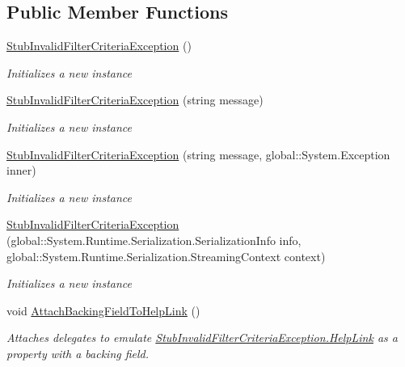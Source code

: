\subsection*{Public Member Functions}
\begin{DoxyCompactItemize}
\item 
\hyperlink{class_system_1_1_reflection_1_1_fakes_1_1_stub_invalid_filter_criteria_exception_a94c607f09115d5aca1cbf268df9ce8cd}{Stub\-Invalid\-Filter\-Criteria\-Exception} ()
\begin{DoxyCompactList}\small\item\em Initializes a new instance\end{DoxyCompactList}\item 
\hyperlink{class_system_1_1_reflection_1_1_fakes_1_1_stub_invalid_filter_criteria_exception_a2b8cabb8680c45a8c38f32785372a9f3}{Stub\-Invalid\-Filter\-Criteria\-Exception} (string message)
\begin{DoxyCompactList}\small\item\em Initializes a new instance\end{DoxyCompactList}\item 
\hyperlink{class_system_1_1_reflection_1_1_fakes_1_1_stub_invalid_filter_criteria_exception_a39cfb89bb28a959b677b9f0725e942c9}{Stub\-Invalid\-Filter\-Criteria\-Exception} (string message, global\-::\-System.\-Exception inner)
\begin{DoxyCompactList}\small\item\em Initializes a new instance\end{DoxyCompactList}\item 
\hyperlink{class_system_1_1_reflection_1_1_fakes_1_1_stub_invalid_filter_criteria_exception_a5c851e0a9ceae44b518983029727af3e}{Stub\-Invalid\-Filter\-Criteria\-Exception} (global\-::\-System.\-Runtime.\-Serialization.\-Serialization\-Info info, global\-::\-System.\-Runtime.\-Serialization.\-Streaming\-Context context)
\begin{DoxyCompactList}\small\item\em Initializes a new instance\end{DoxyCompactList}\item 
void \hyperlink{class_system_1_1_reflection_1_1_fakes_1_1_stub_invalid_filter_criteria_exception_ac2533b970c2c747d2b700fafda915f35}{Attach\-Backing\-Field\-To\-Help\-Link} ()
\begin{DoxyCompactList}\small\item\em Attaches delegates to emulate \hyperlink{class_system_1_1_reflection_1_1_fakes_1_1_stub_invalid_filter_criteria_exception_af98af176e9275d2337478b774f6822b3}{Stub\-Invalid\-Filter\-Criteria\-Exception.\-Help\-Link} as a property with a backing field.\end{DoxyCompactList}\item 

\end{DoxyCompactItemize}
